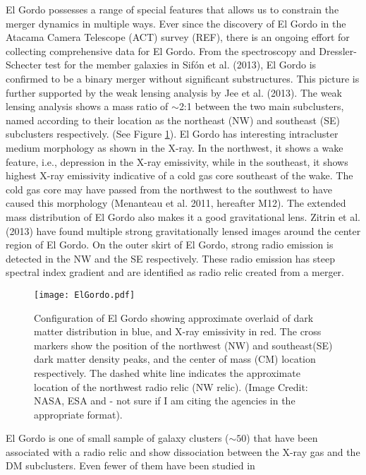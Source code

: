 El Gordo possesses a range of special features that allows us to constrain
the merger dynamics in multiple ways.  Ever since the discovery of El Gordo
in the Atacama Camera Telescope (ACT) survey (REF), there is an ongoing effort for
collecting comprehensive data for El Gordo.
From the spectroscopy and Dressler-Schecter test for the member galaxies  in Sif\'{o}n et al. (2013), El Gordo is confirmed to be a binary merger 
without significant substructures. This picture is further supported by the
weak lensing analysis by Jee et al. (2013). The weak lensing analysis shows
a mass ratio of $\sim$2:1  between the two main subclusters, named according to their location as the northeast (NW) and southeast (SE) subclusters respectively. 
(See Figure \ref{fig:config}). El Gordo has interesting intracluster medium morphology as shown in the X-ray. In the northwest, it shows a wake feature, i.e.,
depression in the X-ray emissivity, while in the southeast, it shows
highest X-ray emissivity indicative of a cold gas core southeast of the
wake. The cold gas core may have passed from the northwest to the southwest
to have caused this morphology (Menanteau et al. 2011, hereafter M12). 
The extended mass distribution of El Gordo also makes it a good
gravitational lens. Zitrin et al. (2013) have found multiple strong
gravitationally lensed images around the center region of El Gordo. 
On the outer skirt of El Gordo, strong radio emission is detected in
the NW and the SE respectively. These radio emission has steep spectral
index gradient and are identified as radio relic created from a merger. 
\begin{figure}
	\texttt{[image: ElGordo.pdf]}
	\caption{Configuration of El Gordo showing approximate overlaid of dark
		matter distribution in blue, and X-ray emissivity in red. The cross
		markers show the position of the northwest (NW) and southeast(SE) dark
		matter density peaks, and the center of mass (CM) location respectively.   
		The dashed white line indicates the approximate location of the northwest 
		radio relic (NW relic).
		(Image Credit: NASA, ESA and \citealt{Jee13} - not sure if I am citing
		the agencies in the appropriate format). 
		\label{fig:config}}
\end{figure}
El Gordo is one of small sample of galaxy clusters ($\sim 50$) that have
been associated with a radio relic and show dissociation between the X-ray
gas and the DM subclusters. Even fewer of them have been studied in
